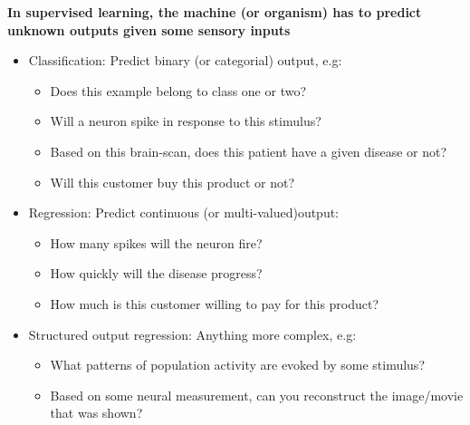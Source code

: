 \textbf{In supervised learning, the machine (or organism) has to predict unknown outputs given some sensory inputs}\\
\begin{itemize}
\item Classification: Predict binary (or categorial) output, e.g:
	\begin{itemize}
    \item Does this example belong to class one or two?
    \item Will a neuron spike in response to this stimulus?
	\item Based on this brain-scan, does this patient have a given disease or not?
	\item Will this customer buy this product or not?
    \end{itemize}

\item Regression: Predict continuous (or multi-valued)output:
	\begin{itemize}
	\item How many spikes will the neuron fire?
    \item How quickly will the disease progress?
	\item How much is this customer willing to pay for this product?
    \end{itemize}

\item Structured output regression: Anything more complex, e.g:
	\begin{itemize}
	\item What patterns of population activity are evoked by some stimulus?
	\item Based on some neural measurement, can you reconstruct the image/movie that was shown?
    \end{itemize}

\end{itemize}

